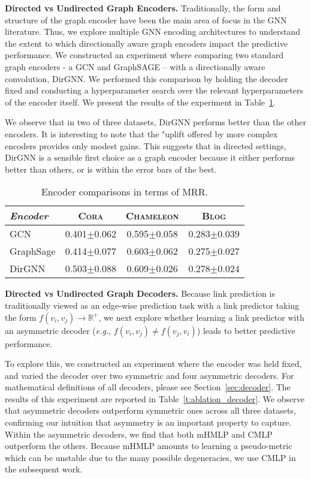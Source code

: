 \documentclass{article}
\begin{document}
\textbf{Directed vs Undirected Graph Encoders.} Traditionally, the form and structure of the graph encoder have been the main area of focus in the GNN literature. Thus, we explore multiple GNN encoding architectures to understand the extent to which directionally aware graph encoders impact the predictive performance. We constructed an experiment where comparing two standard graph encoders - a GCN and GraphSAGE -- with a directionally aware convolution, DirGNN. We performed this comparison by holding the decoder fixed and conducting a hyperparameter search over the relevant hyperparameters of the encoder itself. We present the results of the experiment in Table~\ref{t:ablation_encoder}.

We observe that in two of three datasets, DirGNN performs better than the other encoders. It is interesting to note that the "uplift offered by more complex encoders provides only modest gains. This suggests that in directed settings, DirGNN is a sensible first choice as a graph encoder because it either performs better than others, or is within the error bars of the best. 

\begin{table}[h]
\caption{Encoder comparisons in terms of MRR.} 
\centering
\begin{tabular}{l c c c}
\textit{Encoder}  & \textsc{Cora}  & \textsc{Chameleon} & \textsc{Blog}  \\
\hline
GCN                 & 0.401${\scriptstyle\pm0.062}$ & 0.595${\scriptstyle\pm0.058}$ &  \textcolor{junscolor1}{0.283${\scriptstyle\pm0.039}$} \\
GraphSage           & 0.414${\scriptstyle\pm0.077}$ & 0.603${\scriptstyle\pm0.062}$ &  0.275${\scriptstyle\pm0.027}$ \\
DirGNN              & \textcolor{junscolor1}{0.503${\scriptstyle\pm0.088}$} & \textcolor{junscolor1}{0.609${\scriptstyle\pm0.026}$} &  0.278${\scriptstyle\pm0.024}$ 
\end{tabular}
\label{t:ablation_encoder}
\end{table}

\textbf{Directed vs Undirected Graph Decoders.} Because link prediction is traditionally viewed as an edge-wise prediction task with a link predictor taking the form $f(v_i, v_j) \rightarrow \mathbb{R^+}$, we next explore whether learning a link predictor with an asymmetric decoder (\textit{e.g.}, $f(v_i, v_j) \neq f(v_j, v_i)$) leads to better predictive performance. 

To explore this, we constructed an experiment where the encoder was held fixed, and varied the decoder over two symmetric and four asymmetric decoders. For mathematical definitions of all decoders, please see Section~\ref{sec:decoder}. The results of this experiment are reported in Table~\ref{t:ablation_decoder}. We observe that asymmetric decoders outperform symmetric ones across all three datasets, confirming our intuition that asymmetry is an important property to capture. Within the asymmetric decoders, we find that both mHMLP and CMLP outperform the others. Because mHMLP amounts to learning a pseudo-metric which can be unstable due to the many possible degeneracies, we use CMLP in the subsequent work.
\end{document}
